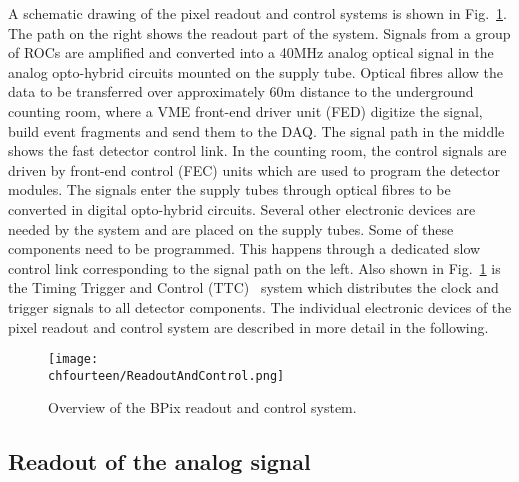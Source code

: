 A schematic drawing of the pixel readout and control systems is shown in Fig.~\ref{fig:BPixSystem}.
The path on the right shows the readout part of the system.
Signals from a group of ROCs are amplified and converted into a 40\unit{MHz} analog optical signal in the analog opto-hybrid circuits mounted on the supply tube.
Optical fibres allow the data to be transferred over approximately 60\unit{m} distance to the underground counting room, where a VME front-end driver unit (FED) digitize the signal, build event fragments and send them to the DAQ.
The signal path in the middle shows the fast detector control link.
In the counting room, the control signals are driven by front-end control (FEC) units which are used to program the detector modules.
The signals enter the supply tubes through optical fibres to be converted in digital opto-hybrid circuits.
Several other electronic devices are needed by the system and are placed on the supply tubes.
Some of these components need to be programmed. This happens through a dedicated slow control link corresponding to the signal path on the left.
Also shown in Fig.~\ref{fig:BPixSystem} is the Timing Trigger and Control (TTC)~\cite{Taylor:592719} system which distributes the clock and trigger signals to all detector components.
The individual electronic devices of the pixel readout and control system are described in more detail in the following.

\begin{figure}[!htb]
 \begin{center}
 \texttt{[image: \\chfourteen/ReadoutAndControl.png]}
 \end{center}
 \caption{Overview of the BPix readout and control system.}
 \label{fig:BPixSystem}
\end{figure}

\subsection{Readout of the analog signal}\label{subsec:BPixReadout}

